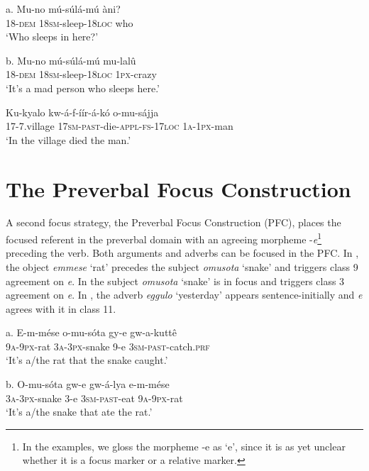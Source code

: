 \documentclass[output=paper]{langsci/langscibook}
\begin{document}
\ea
\gll a.  Mu-no    mú-súlá-mú    àni?\\
       18-\textsc{dem}  \textsc{18sm}-sleep-\textsc{18loc}  who\\
\glt   ‘Who sleeps in here?’
\z

\ea
\gll b.  Mu-no    mú-súlá-mú    mu-lalû\\
       18-\textsc{dem}  1\textsc{8sm}-sleep-\textsc{18loc}  \textsc{1px}-crazy\\
\glt   ‘It’s a mad person who sleeps here.’
\z

\ea
\gll Ku-kyalo  kw-á-f-íír-á-kó      o-mu-sájja\\
     17-7.village  \textsc{17sm}-\textsc{past}-die-\textsc{appl}-\textsc{fs}-\textsc{17loc}  \textsc{1a-1px}-man\\
\glt ‘In the village died the man.’
\z

\section{The Preverbal Focus Construction}
 

A second focus strategy, the Preverbal Focus Construction (PFC), places the focused referent in the preverbal domain with an agreeing morpheme -\textit{e}\footnote{In the examples, we gloss the morpheme -e as ‘e’, since it is as yet unclear whether it is a focus marker or a relative marker.}{} preceding the verb. Both arguments and adverbs can be focused in the PFC. In , the object \textit{emmese} ‘rat’ precedes the subject \textit{omusota} ‘snake’ and triggers class 9 agreement on \textit{e}. In  the subject \textit{omusota} ‘snake’ is in focus and triggers class 3 agreement on \textit{e}. In , the adverb \textit{eggulo} ‘yesterday’ appears sentence-initially and \textit{e} agrees with it in class 11.

\ea
\gll a.  E-m-mése  o-mu-sóta    gy-e  gw-a-kuttê{\textup{} }\\
       \textsc{9a-9px}-rat  \textsc{3a}-\textsc{3px}-snake  9-e  \textsc{3sm}-\textsc{past}-catch.\textsc{prf}\\
\glt   ‘It’s a/the rat that the snake caught.’
\z

\ea
\gll b.  O-mu-sóta    gw-e  gw-á-lya    e-m-mése\\
       \textsc{3a-3px}-snake  3-e  \textsc{3sm-past}-eat  \textsc{9a-9px}-rat\\
\glt   ‘It’s a/the snake that ate the rat.’
\z
\end{document}
